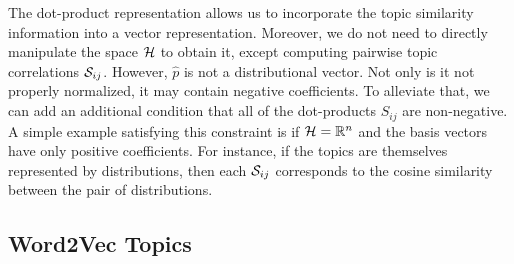 The dot-product representation allows us to incorporate the topic
similarity information into a vector representation. Moreover, we do
not need to directly manipulate the space ${\mathcal H}$ to obtain it, except
computing pairwise topic correlations ${\mathcal S}_{ij}$. However,
$\widehat{p}$ is not a distributional vector. Not only is it not
properly normalized, it may contain negative coefficients. To
alleviate that, we can add an additional condition that all of the
dot-products $S_{ij}$ are non-negative. A simple example satisfying
this constraint is if ${\mathcal H}={\mathbb R}^n$ and the basis vectors have only
positive coefficients. For instance, if the topics are
themselves represented by distributions, then each ${\mathcal S}_{ij}$
corresponds to the cosine similarity between the pair of
distributions.

\subsection{Word2Vec Topics}

